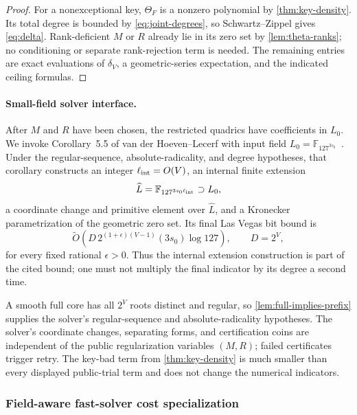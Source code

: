 \documentclass[10pt,a4paper]{article}
\newcommand{\F}{\mathbb F}
\newcommand{\softO}{\widetilde O}
\begin{document}
\begin{proof}
For a nonexceptional key, $\Theta_F$ is a nonzero polynomial by \cref{thm:key-density}.  Its total degree is bounded by \eqref{eq:joint-degrees}, so Schwartz--Zippel gives \eqref{eq:delta}.  Rank-deficient $M$ or $R$ already lie in its zero set by \cref{lem:theta-ranks}; no conditioning or separate rank-rejection term is needed.  The remaining entries are exact evaluations of $\delta_V$, a geometric-series expectation, and the indicated ceiling formulas.
\end{proof}

\paragraph{Small-field solver interface.}
After $M$ and $R$ have been chosen, the restricted quadrics have coefficients in $L_0$.  We invoke Corollary~5.5 of van der Hoeven--Lecerf with input field $L_0=\F_{127^{3s_0}}$~\cite{vdHL}.  Under the regular-sequence, absolute-radicality, and degree hypotheses, that corollary constructs an integer $\ell_{\rm int}=O(V)$, an internal finite extension
\[
\widehat L=\F_{127^{3s_0\ell_{\rm int}}}\supset L_0,
\]
a coordinate change and primitive element over $\widehat L$, and a Kronecker parametrization of the geometric zero set.  Its final Las Vegas bit bound is
\[
\softO\!\left(D\,2^{(1+\epsilon)(V-1)}(3s_0)\log 127\right),
\qquad D=2^V,
\]
for every fixed rational $\epsilon>0$.  Thus the internal extension construction is part of the cited bound; one must not multiply the final indicator by its degree a second time.

A smooth full core has all $2^V$ roots distinct and regular, so \cref{lem:full-implies-prefix} supplies the solver's regular-sequence and absolute-radicality hypotheses.  The solver's coordinate changes, separating forms, and certification coins are independent of the public regularization variables $(M,R)$; failed certificates trigger retry.  The key-bad term from \cref{thm:key-density} is much smaller than every displayed public-trial term and does not change the numerical indicators.

\subsubsection{Field-aware fast-solver cost specialization}
\end{document}
